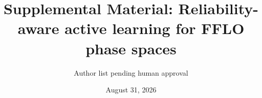 \documentclass[aps,prl,preprint,superscriptaddress,floatfix]{revtex4-2}
\begin{document}
\title{Supplemental Material: Reliability-aware active learning for FFLO phase spaces}
\author{Author list pending human approval}
\date{August 31, 2026}
\maketitle
\setcounter{figure}{0}
\renewcommand{\thefigure}{S\arabic{figure}}

\end{document}
